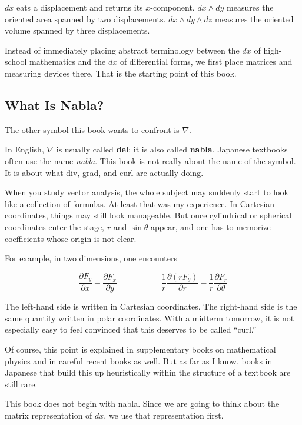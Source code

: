 \documentclass[a4paper,12pt,openany]{book}
\begin{document}
\(dx\) eats a displacement and returns its \(x\)-component.
\(dx\wedge dy\) measures the oriented area spanned by two displacements.
\(dx\wedge dy\wedge dz\) measures the oriented volume spanned by three
displacements.

Instead of immediately placing abstract terminology between the \(dx\)
of high-school mathematics and the \(dx\) of differential forms, we
first place matrices and measuring devices there. That is the starting
point of this book.

\hypertarget{what-is-nabla}{%
\subsection{What Is Nabla?}\label{what-is-nabla}}

The other symbol this book wants to confront is \(\nabla\).

In English, \(\nabla\) is usually called \textbf{del}; it is also called
\textbf{nabla}. Japanese textbooks often use the name \emph{nabla}. This
book is not really about the name of the symbol. It is about what div,
grad, and curl are actually doing.

When you study vector analysis, the whole subject may suddenly start to
look like a collection of formulas. At least that was my experience. In
Cartesian coordinates, things may still look manageable. But once
cylindrical or spherical coordinates enter the stage, \(r\) and
\(\sin\theta\) appear, and one has to memorize coefficients whose origin
is not clear.

For example, in two dimensions, one encounters

\[
\frac{\partial F_y}{\partial x}-\frac{\partial F_x}{\partial y}
\qquad=\qquad
\frac{1}{r}\frac{\partial (r F_\theta)}{\partial r}-\frac{1}{r}\frac{\partial F_r}{\partial \theta}
\]

The left-hand side is written in Cartesian coordinates. The right-hand
side is the same quantity written in polar coordinates. With a midterm
tomorrow, it is not especially easy to feel convinced that this deserves
to be called ``curl.''

Of course, this point is explained in supplementary books on
mathematical physics and in careful recent books as well. But as far as
I know, books in Japanese that build this up heuristically within the
structure of a textbook are still rare.

This book does not begin with nabla. Since we are going to think about
the matrix representation of \(dx\), we use that representation first.
\end{document}
